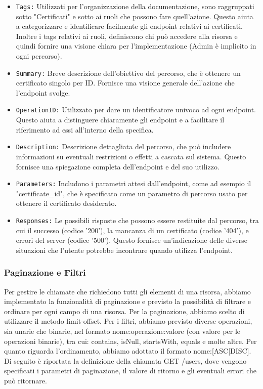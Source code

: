 \begin{itemize}
    \item \label{Tags}
    \texttt{Tags:} Utilizzati per l'organizzazione della documentazione, sono raggruppati sotto "Certificati" e sotto ai ruoli che possono fare quell'azione. Questo aiuta a categorizzare e identificare facilmente gli endpoint relativi ai certificati. Inoltre i tags relativi ai ruoli, definiscono chi può accedere alla risorsa e quindi fornire una visione chiara per l'implementazione (Admin è implicito in ogni percorso).
    \item \texttt{Summary:} Breve descrizione dell'obiettivo del percorso, che è ottenere un certificato singolo per ID. Fornisce una visione generale dell'azione che l'endpoint svolge.
    \item \texttt{OperationID:} Utilizzato per dare un identificatore univoco ad ogni endpoint. Questo aiuta a distinguere chiaramente gli endpoint e a facilitare il riferimento ad essi all'interno della specifica.
    \item \texttt{Description:} Descrizione dettagliata del percorso, che può includere informazioni su eventuali restrizioni o effetti a cascata sul sistema. Questo fornisce una spiegazione completa dell'endpoint e del suo utilizzo.
    \item \texttt{Parameters:} Includono i parametri attesi dall'endpoint, come ad esempio il "certificate\_id", che è specificato come un parametro di percorso usato per ottenere il certificato desiderato.
    \item \texttt{Responses:} Le possibili risposte che possono essere restituite dal percorso, tra cui il successo (codice '200'), la mancanza di un certificato (codice '404'), e errori del server (codice '500'). Questo fornisce un'indicazione delle diverse situazioni che l'utente potrebbe incontrare quando utilizza l'endpoint.
\end{itemize}

\subsubsection{Paginazione e Filtri}
\label{Paginazione}

Per gestire le chiamate che richiedono tutti gli elementi di una risorsa, abbiamo implementato la funzionalità di paginazione e previsto la possibilità di filtrare e ordinare per ogni campo di una risorsa.
Per la paginazione, abbiamo scelto di utilizzare il metodo limit-offset.
Per i filtri, abbiamo previsto diverse operazioni, sia unarie che binarie, nel formato nome:operazione{:valore} (con valore per le operazioni binarie), tra cui: contains, isNull, startsWith, equals e molte altre.
Per quanto riguarda l'ordinamento, abbiamo adottato il formato nome:[ASC|DISC].
Di seguito è riportata la definizione della chiamata GET /users, dove vengono specificati i parametri di paginazione, il valore di ritorno e gli eventuali errori che può ritornare.

